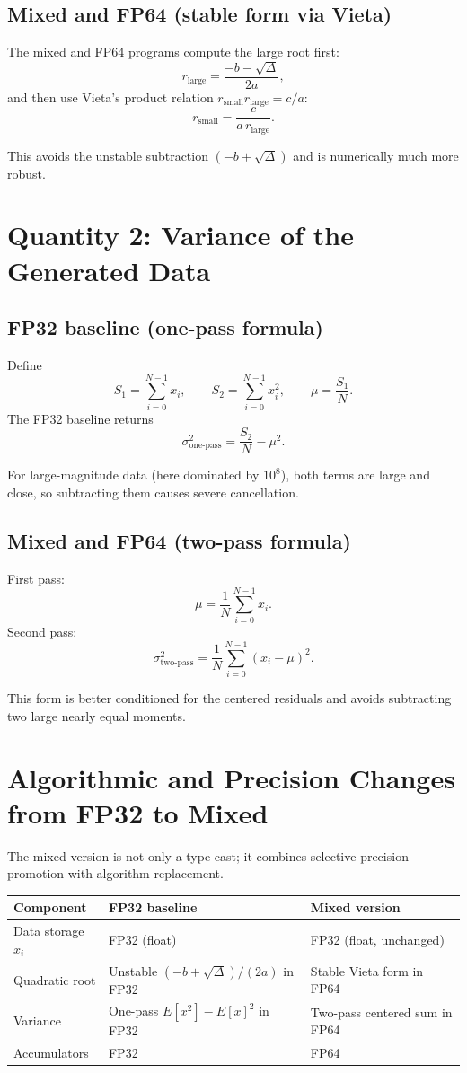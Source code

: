 \documentclass[11pt]{article}
\begin{document}
\subsection{Mixed and FP64 (stable form via Vieta)}
The mixed and FP64 programs compute the large root first:
\[
r_{\text{large}} = \frac{-b - \sqrt{\Delta}}{2a},
\]
and then use Vieta's product relation \(r_{\text{small}}r_{\text{large}} = c/a\):
\[
r_{\text{small}} = \frac{c}{a\,r_{\text{large}}}.
\]

This avoids the unstable subtraction \((-b + \sqrt{\Delta})\) and is numerically much more robust.

\section{Quantity 2: Variance of the Generated Data}

\subsection{FP32 baseline (one-pass formula)}
Define
\[
S_1 = \sum_{i=0}^{N-1} x_i,
\qquad
S_2 = \sum_{i=0}^{N-1} x_i^2,
\qquad
\mu = \frac{S_1}{N}.
\]
The FP32 baseline returns
\[
\sigma^2_{\text{one-pass}} = \frac{S_2}{N} - \mu^2.
\]

For large-magnitude data (here dominated by \(10^8\)), both terms are large and close, so subtracting them causes severe cancellation.

\subsection{Mixed and FP64 (two-pass formula)}
First pass:
\[
\mu = \frac{1}{N}\sum_{i=0}^{N-1} x_i.
\]
Second pass:
\[
\sigma^2_{\text{two-pass}} = \frac{1}{N}\sum_{i=0}^{N-1}(x_i-\mu)^2.
\]

This form is better conditioned for the centered residuals and avoids subtracting two large nearly equal moments.

\section{Algorithmic and Precision Changes from FP32 to Mixed}
The mixed version is not only a type cast; it combines selective precision promotion with algorithm replacement.

\begin{center}
\begin{tabular}{@{}lll@{}}
\toprule
Component & FP32 baseline & Mixed version \\
\midrule
Data storage \(x_i\) & FP32 (float) & FP32 (float, unchanged) \\
Quadratic root & Unstable \((-b+\sqrt{\Delta})/(2a)\) in FP32 & Stable Vieta form in FP64 \\
Variance & One-pass \(E[x^2]-E[x]^2\) in FP32 & Two-pass centered sum in FP64 \\
Accumulators & FP32 & FP64 \\
\bottomrule
\end{tabular}
\end{center}
\end{document}
